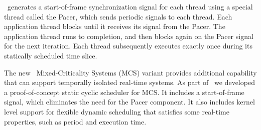 \briefcase\ generates a start-of-frame synchronization signal for each thread using
a special thread called the Pacer, which sends periodic signals
to each thread. Each application thread blocks until it receives its
signal from the Pacer. The application thread runs to completion, and then
blocks again on the Pacer signal for the next iteration. 
Each thread subsequently executes
exactly once during its statically scheduled time slice.

The new \selFour\ Mixed-Criticality Systems (MCS) variant provides
additional capability that can support temporally isolated
real-time systems. 
As part of \briefcase\ we developed a proof-of-concept static cyclic
scheduler for MCS.
It includes a start-of-frame signal, which
eliminates the need for the Pacer component. It also includes kernel
level support for flexible dynamic scheduling that satisfies some
real-time properties, such as period and execution time.

